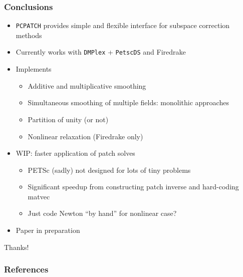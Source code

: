 \documentclass[presentation,aspectratio=43, 10pt]{beamer}
\begin{document}
\begin{frame}
  \frametitle{Conclusions}
  \begin{itemize}
  \item \texttt{PCPATCH} provides simple and flexible interface for
    subspace correction methods
  \item Currently works with \texttt{DMPlex} + \texttt{PetscDS} and
    Firedrake
  \item Implements
    \begin{itemize}
    \item Additive and multiplicative smoothing
    \item Simultaneous smoothing of multiple fields: monolithic
      approaches
    \item Partition of unity (or not)
    \item Nonlinear relaxation (Firedrake only)
    \end{itemize}
  \item WIP: faster application of patch solves
    \begin{itemize}
    \item PETSc (sadly) not designed for lots of tiny problems
    \item Significant speedup from constructing patch inverse and
      hard-coding matvec
    \item Just code Newton ``by hand'' for nonlinear case?
    \end{itemize}
  \item Paper in preparation
  \end{itemize}

  \begin{center}
    Thanks!
  \end{center}
\end{frame}

\appendix
\begin{frame}
  \frametitle{References}
  \printbibliography[heading=none]
\end{frame}
\end{document}
